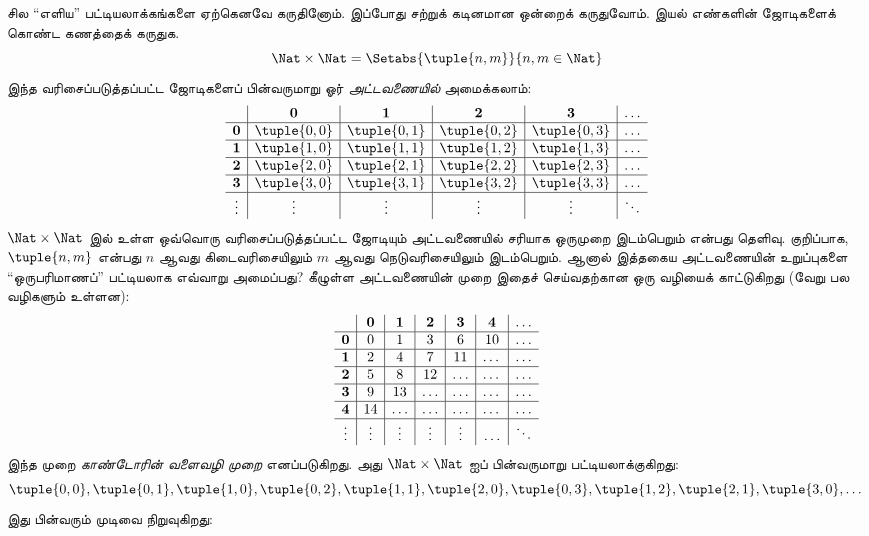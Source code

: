 \documentclass[../../../include/open-logic-section]{subfiles}
\begin{document}


\begin{explain}
சில “எளிய” பட்டியலாக்கங்களை ஏற்கெனவே கருதினோம்.
இப்போது சற்றுக் கடினமான ஒன்றைக் கருதுவோம்.
இயல் எண்களின் ஜோடிகளைக் கொண்ட கணத்தைக் கருதுக.
\[
\Nat \times \Nat = \Setabs{\tuple{n,m}}{n,m \in \Nat}
\]
இந்த வரிசைப்படுத்தப்பட்ட ஜோடிகளைப் பின்வருமாறு ஓர்
\emph{அட்டவணையில்} அமைக்கலாம்:
\[
\begin{array}{ c | c | c | c | c | c}
& \mathbf 0 & \mathbf 1 & \mathbf 2 & \mathbf 3 & \dots \\
\hline
\mathbf 0 & \tuple{0,0} & \tuple{0,1} & \tuple{0,2} & \tuple{0,3} & \dots \\
\hline
\mathbf 1 & \tuple{1,0} & \tuple{1,1} & \tuple{1,2} & \tuple{1,3} & \dots \\
\hline
\mathbf 2 & \tuple{2,0} & \tuple{2,1} & \tuple{2,2} & \tuple{2,3} & \dots \\
\hline
\mathbf 3 & \tuple{3,0} & \tuple{3,1} & \tuple{3,2} & \tuple{3,3} & \dots \\
\hline
\vdots & \vdots & \vdots & \vdots & \vdots & \ddots\\
\end{array}
\]
$\Nat \times \Nat$ இல் உள்ள ஒவ்வொரு வரிசைப்படுத்தப்பட்ட ஜோடியும்
அட்டவணையில் சரியாக ஒருமுறை இடம்பெறும் என்பது தெளிவு.
குறிப்பாக, $\tuple{n,m}$ என்பது $n$ ஆவது கிடைவரிசையிலும்
$m$ ஆவது நெடுவரிசையிலும் இடம்பெறும்.
ஆனால் இத்தகைய அட்டவணையின் உறுப்புகளை “ஒருபரிமாணப்”
பட்டியலாக எவ்வாறு அமைப்பது?
கீழுள்ள அட்டவணையின் முறை இதைச் செய்வதற்கான ஒரு வழியைக் காட்டுகிறது
(வேறு பல வழிகளும் உள்ளன):
\[
\begin{array}{ c | c | c | c | c | c | c}
& \mathbf 0 & \mathbf 1 & \mathbf 2 & \mathbf 3 & \mathbf 4 &\dots \\
\hline
\mathbf 0 & 0  & 1& 3 & 6& 10 &\ldots \\
\hline
\mathbf 1 &2 & 4& 7 & 11 & \dots &\ldots \\
\hline
\mathbf 2 & 5 & 8 & 12 & \ldots & \dots&\ldots \\
\hline
\mathbf 3 & 9 & 13 & \ldots & \ldots & \dots & \ldots \\
\hline
\mathbf 4 & 14 & \ldots & \ldots & \ldots & \dots & \ldots \\
\hline
\vdots & \vdots & \vdots & \vdots & \vdots&\ldots & \ddots\\
\end{array}
\]\noindent
இந்த முறை \emph{காண்டோரின் வளைவழி முறை} எனப்படுகிறது.
அது $\Nat \times \Nat$ ஐப் பின்வருமாறு பட்டியலாக்குகிறது:
\[
\tuple{0,0}, \tuple{0,1}, \tuple{1,0}, \tuple{0,2}, \tuple{1,1},
\tuple{2,0}, \tuple{0,3}, \tuple{1,2}, \tuple{2,1}, \tuple{3,0}, \dots
\]
இது பின்வரும் முடிவை நிறுவுகிறது:
\end{explain}
\end{document}
